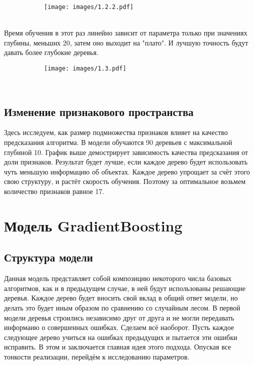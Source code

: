 \documentclass[a4paper,14pt]{article}
\begin{document}
\begin{figure}[h!]
                \centering
                \begin{subfigure}[b]{1.0\textwidth}
                    \texttt{[image: images/1.2.2.pdf]}
                \end{subfigure}
            \end{figure} \\

Время обучения в этот раз линейно зависит от параметра только при значениях глубины, меньших 20, затем оно выходит на "плато". И лучшую точность будут давать более глубокие деревья.

\begin{figure}[h!]
                \centering
                \begin{subfigure}[b]{1.0\textwidth}
                    \texttt{[image: images/1.3.pdf]}
                \end{subfigure}
            \end{figure} \\

\subsection{Изменение признакового пространства}
Здесь исследуем, как размер подмножества признаков влияет на качество предсказания алгоритма. В модели обучаются 90 деревьев с максимальной глубиной 10. 
График выше демострирует зависимость качества предсказания от доли признаков. Результат будет лучше, если каждое дерево будет использовать чуть меньшую информацию об объектах. Каждое дерево упрощает за счёт этого свою структуру, и растёт скорость обучения. Поэтому за оптимальное возьмем количество признаков равное 17.

\section{Модель GradientBoosting}
\subsection{Структура модели}
Данная модель представляет собой композицию некоторого числа базовых алгоритмов, как и в предыдущем случае, в ней будут использованы решающие деревья. Каждое дерево будет вносить свой вклад в общий ответ модели, но делать это будет иным образом по сравнению со случайным лесом. В первой модели деревья строились независимо друг от друга и не могли передавать информаию о совершенных ошибках. Сделаем всё наоборот. Пусть каждое следующее дерево учиться на ошибках предыдущих и пытается эти ошибки исправить. В этом и заключается главная идея этого подхода. Опуская все тонкости реализации, перейдём к исследованию параметров.
\end{document}
